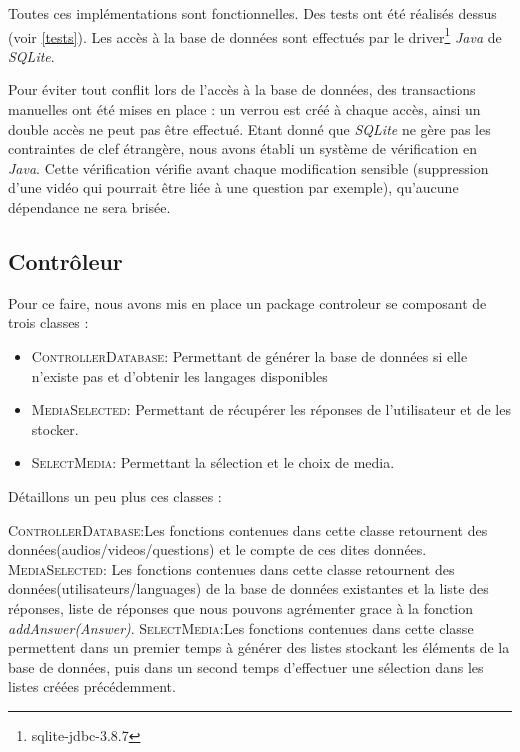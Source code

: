 Toutes ces implémentations sont fonctionnelles. Des tests ont été réalisés dessus (voir \ref{tests}).
Les accès à la base de données sont effectués par le driver\footnote{sqlite-jdbc-3.8.7} \textit{Java} de \textit{SQLite}.

Pour éviter tout conflit lors de l'accès à la base de données, des transactions manuelles ont été mises en place : un verrou est créé à chaque accès, ainsi un double accès ne peut pas être effectué.
Etant donné que \textit{SQLite} ne gère pas les contraintes de clef étrangère, nous avons établi un système de vérification en \textit{Java}. Cette vérification vérifie avant chaque modification sensible (suppression d'une vidéo qui pourrait être liée à une question par exemple), qu'aucune dépendance ne sera brisée.


\subsection{Contrôleur}\label{controller}



Pour ce faire, nous avons mis en place un package controleur se composant de trois classes :

\begin{itemize}
  \item \textsc{ControllerDatabase}: Permettant de générer la base de données si elle n'existe pas et d'obtenir les langages disponibles
  \item \textsc{MediaSelected}: Permettant de récupérer les réponses de l'utilisateur et de les stocker.
  \item \textsc{SelectMedia}: Permettant la sélection et le choix de media.
\end{itemize}

Détaillons un peu plus ces classes :

\textsc{ControllerDatabase}:Les fonctions contenues dans cette classe retournent des données(audios/videos/questions) et le compte de ces dites données.
\textsc{MediaSelected}: Les fonctions contenues dans cette classe retournent des données(utilisateurs/languages) de la base de données existantes et la liste des réponses, liste de réponses que nous pouvons agrémenter grace à la fonction \textit{addAnswer(Answer)}.
\textsc{SelectMedia}:Les fonctions contenues dans cette classe permettent dans un premier temps à générer des listes stockant les éléments de la base de données, puis dans un second temps d'effectuer une sélection dans les listes créées précédemment.

